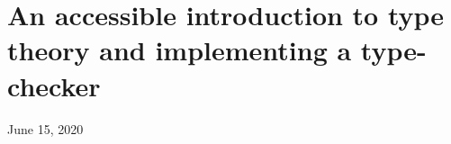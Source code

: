 %
%
%
%
%
%

\hypertarget{top-of-page}{%
\chapter{An accessible introduction to type theory and implementing a
type-checker}\label{top-of-page}}

June 15, 2020

